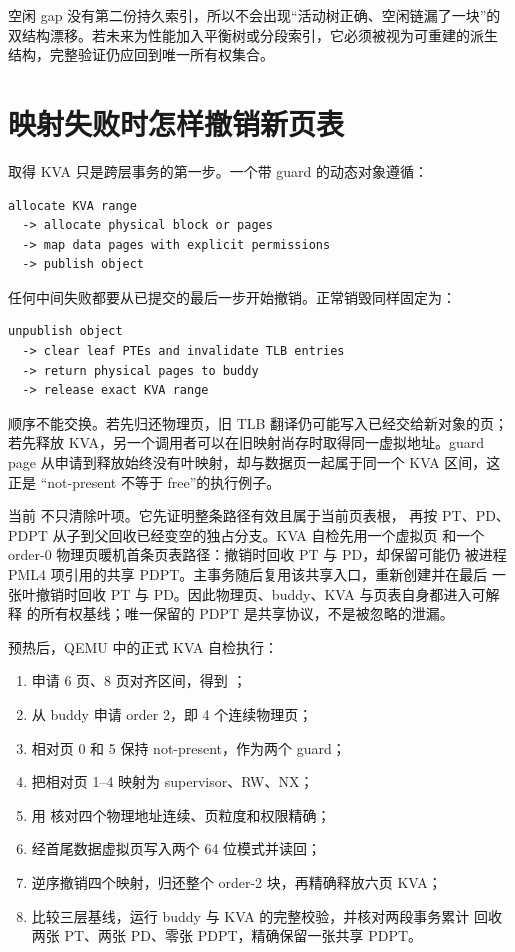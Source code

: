空闲 gap 没有第二份持久索引，所以不会出现“活动树正确、空闲链漏了一块”的
双结构漂移。若未来为性能加入平衡树或分段索引，它必须被视为可重建的派生
结构，完整验证仍应回到唯一所有权集合。

\section{映射失败时怎样撤销新页表}
取得 KVA 只是跨层事务的第一步。一个带 guard 的动态对象遵循：

\begin{verbatim}
allocate KVA range
  -> allocate physical block or pages
  -> map data pages with explicit permissions
  -> publish object
\end{verbatim}

任何中间失败都要从已提交的最后一步开始撤销。正常销毁同样固定为：

\begin{verbatim}
unpublish object
  -> clear leaf PTEs and invalidate TLB entries
  -> return physical pages to buddy
  -> release exact KVA range
\end{verbatim}

顺序不能交换。若先归还物理页，旧 TLB 翻译仍可能写入已经交给新对象的页；
若先释放 KVA，另一个调用者可以在旧映射尚存时取得同一虚拟地址。guard page
从申请到释放始终没有叶映射，却与数据页一起属于同一个 KVA 区间，这正是
“not-present 不等于 free”的执行例子。

当前  不只清除叶项。它先证明整条路径有效且属于当前页表根，
再按 PT、PD、PDPT 从子到父回收已经变空的独占分支。KVA 自检先用一个虚拟页
和一个 order-0 物理页暖机首条页表路径：撤销时回收 PT 与 PD，却保留可能仍
被进程 PML4 项引用的共享 PDPT。主事务随后复用该共享入口，重新创建并在最后
一张叶撤销时回收 PT 与 PD。因此物理页、buddy、KVA 与页表自身都进入可解释
的所有权基线；唯一保留的 PDPT 是共享协议，不是被忽略的泄漏。

预热后，QEMU 中的正式 KVA 自检执行：

\begin{enumerate}[label=\arabic*.]
  \item 申请 6 页、8 页对齐区间，得到
        ；
  \item 从 buddy 申请 order 2，即 4 个连续物理页；
  \item 相对页 0 和 5 保持 not-present，作为两个 guard；
  \item 把相对页 1--4 映射为 supervisor、RW、NX；
  \item 用  核对四个物理地址连续、页粒度和权限精确；
  \item 经首尾数据虚拟页写入两个 64 位模式并读回；
  \item 逆序撤销四个映射，归还整个 order-2 块，再精确释放六页 KVA；
  \item 比较三层基线，运行 buddy 与 KVA 的完整校验，并核对两段事务累计
        回收两张 PT、两张 PD、零张 PDPT，精确保留一张共享 PDPT。
\end{enumerate}

